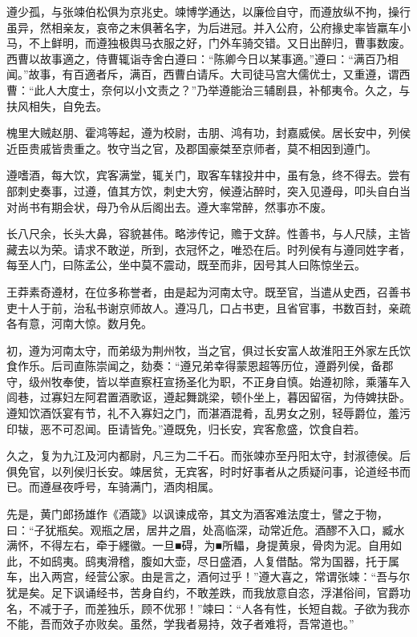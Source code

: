 \documentclass[]{article}
\begin{document}
遵少孤，与张竦伯松俱为京兆史。竦博学通达，以廉俭自守，而遵放纵不拘，操行虽异，然相亲友，哀帝之末俱著名字，为后进冠。并入公府，公府掾史率皆羸车小马，不上鲜明，而遵独极舆马衣服之好，门外车骑交错。又日出醉归，曹事数废。西曹以故事適之，侍曹辄诣寺舍白遵曰：``陈卿今日以某事適。''遵曰：``满百乃相闻。''故事，有百適者斥，满百，西曹白请斥。大司徒马宫大儒优士，又重遵，谓西曹：``此人大度士，奈何以小文责之？''乃举遵能治三辅剧县，补郁夷令。久之，与扶风相失，自免去。

槐里大贼赵朋、霍鸿等起，遵为校尉，击朋、鸿有功，封嘉威侯。居长安中，列侯近臣贵戚皆贵重之。牧守当之官，及郡国豪桀至京师者，莫不相因到遵门。

遵嗜酒，每大饮，宾客满堂，辄关门，取客车辖投井中，虽有急，终不得去。尝有部刺史奏事，过遵，值其方饮，刺史大穷，候遵沾醉时，突入见遵母，叩头自白当对尚书有期会状，母乃令从后阁出去。遵大率常醉，然事亦不废。

长八尺余，长头大鼻，容貌甚伟。略涉传记，赡于文辞。性善书，与人尺牍，主皆藏去以为荣。请求不敢逆，所到，衣冠怀之，唯恐在后。时列侯有与遵同姓字者，每至人门，曰陈孟公，坐中莫不震动，既至而非，因号其人曰陈惊坐云。

王莽素奇遵材，在位多称誉者，由是起为河南太守。既至官，当遣从史西，召善书吏十人于前，治私书谢京师故人。遵冯几，口占书吏，且省官事，书数百封，亲疏各有意，河南大惊。数月免。

初，遵为河南太守，而弟级为荆州牧，当之官，俱过长安富人故淮阳王外家左氏饮食作乐。后司直陈崇闻之，劾奏：``遵兄弟幸得蒙恩超等历位，遵爵列侯，备郡守，级州牧奉使，皆以举直察枉宣扬圣化为职，不正身自慎。始遵初除，乘藩车入闾巷，过寡妇左阿君置酒歌讴，遵起舞跳梁，顿仆坐上，暮因留宿，为侍婢扶卧。遵知饮酒饫宴有节，礼不入寡妇之门，而湛酒混肴，乱男女之别，轻辱爵位，羞污印韨，恶不可忍闻。臣请皆免。''遵既免，归长安，宾客愈盛，饮食自若。

久之，复为九江及河内都尉，凡三为二千石。而张竦亦至丹阳太守，封淑德侯。后俱免官，以列侯归长安。竦居贫，无宾客，时时好事者从之质疑问事，论道经书而已。而遵昼夜呼号，车骑满门，酒肉相属。

先是，黄门郎扬雄作《酒箴》以讽谏成帝，其文为酒客难法度士，譬之于物，曰：``子犹瓶矣。观瓶之居，居井之眉，处高临深，动常近危。酒醪不入口，臧水满怀，不得左右，牵于纆徽。一旦■碍，为■所轠，身提黄泉，骨肉为泥。自用如此，不如鸱夷。鸱夷滑稽，腹如大壶，尽日盛酒，人复借酤。常为国器，托于属车，出入两宫，经营公家。由是言之，酒何过乎！''遵大喜之，常谓张竦：``吾与尔犹是矣。足下讽诵经书，苦身自约，不敢差跌，而我放意自恣，浮湛俗间，官爵功名，不减于子，而差独乐，顾不优邪！''竦曰：``人各有性，长短自裁。子欲为我亦不能，吾而效子亦败矣。虽然，学我者易持，效子者难将，吾常道也。''
\end{document}
